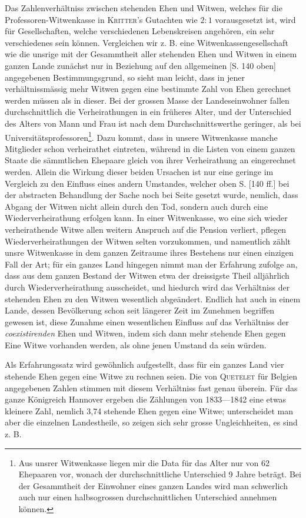 Das Zahlenverhältniss zwischen stehenden Ehen und Witwen, welches für die Professoren-Witwenkasse in \textsc{Kritter}’s Gutachten wie \(2:1\) vorausgesetzt ist, wird für Gesellschaften, welche verschiedenen Lebenskreisen angehören, ein sehr verschiedenes sein können. Vergleichen wir z. B. eine Witwenkassengesellschaft wie die unsrige mit der Gesammtheit aller stehenden Ehen und Witwen in einem ganzen Lande zunächst nur in Beziehung auf den allgemeinen [S. 140 oben] angegebenen Bestimmungsgrund, so sieht man leicht, dass in jener verhältnissmässig mehr Witwen gegen eine bestimmte Zahl von Ehen gerechnet werden müssen als in dieser. Bei der grossen Masse der Landeseinwohner fallen durchschnittlich die Verheirathungen in ein früheres Alter, und der Unterschied des Alters von Mann und Frau ist nach dem Durchschnittswerthe geringer, als bei Universitätsprofessoren\footnote{Aus unsrer Witwenkasse liegen mir die Data für das Alter nur von 62 Ehepaaren vor, wonach der durchschnittliche Unterschied 9 Jahre beträgt. Bei der Gesammtheit der Einwohner eines ganzen Landes wird man schwerlich auch nur einen halbsogrossen durchschnittlichen Unterschied annehmen können.}. Dazu kommt, dass in unsere Witwenkasse manche Mitglieder schon verheirathet eintreten, während in die Listen von einem ganzen Staate die sämmtlichen Ehepaare gleich von ihrer Verheirathung an eingerechnet werden. Allein die Wirkung dieser beiden Ursachen ist nur eine geringe im Vergleich zu den Einfluss eines andern Umstandes, welcher oben S. [140 ff.] bei der abstracten Behandlung der Sache noch bei Seite gesetzt wurde, nemlich, dass Abgang der Witwen nicht allein durch den Tod, sondern auch durch eine Wiederverheirathung erfolgen kann. In einer Witwenkasse, wo eine sich wieder verheirathende Witwe allen weitern Anspruch auf die Pension verliert, pflegen Wiederverheirathungen der Witwen selten vorzukommen, und namentlich zählt unsre Witwenkasse in dem ganzen Zeitraume ihres Bestehens nur einen einzigen Fall der Art; für ein ganzes Land hingegen nimmt man der Erfahrung zufolge an, dass aus dem ganzen Bestand der Witwen etwa der dreissigste Theil alljährlich durch Wiederverheirathung ausscheidet, und hiedurch wird das Verhältniss der stehenden Ehen zu den Witwen wesentlich abgeändert. Endlich hat auch in einem Lande, dessen Bevölkerung schon seit längerer Zeit im Zunehmen begriffen gewesen ist, diese Zunahme einen wesentlichen Einfluss auf das Verhältniss der \textit{coexistirenden} Ehen und Witwen, indem sich dann mehr stehende Ehen gegen Eine Witwe vorhanden werden, als ohne jenen Umstand da sein würden.

Als Erfahrungssatz wird gewöhnlich aufgestellt, dass für ein ganzes Land vier stehende Ehen gegen eine Witwe zu rechnen seien. Die von \textsc{Quetelet} für Belgien angegebenen Zahlen stimmen mit diesem Verhältniss fast genau überein. Für das ganze Königreich Hannover ergeben die Zählungen von 1833—1842 eine etwas kleinere Zahl, nemlich 3,74 stehende Ehen gegen eine Witwe; unterscheidet man aber die einzelnen Landestheile, so zeigen sich sehr grosse Ungleichheiten, es sind z. B.
